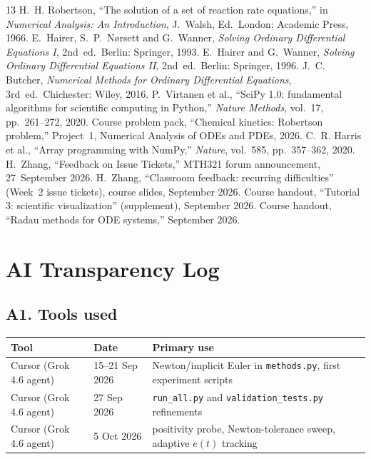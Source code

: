 \documentclass[11pt,a4paper]{article}
\begin{document}
\FloatBarrier
\begin{thebibliography}{13}
H.~H. Robertson, ``The solution of a set of reaction rate equations,'' in \emph{Numerical Analysis: An Introduction}, J.~Walsh, Ed.\ London: Academic Press, 1966.
E.~Hairer, S.~P.\ N{\o}rsett and G.~Wanner, \emph{Solving Ordinary Differential Equations I}, 2nd~ed.\ Berlin: Springer, 1993.
E.~Hairer and G.~Wanner, \emph{Solving Ordinary Differential Equations II}, 2nd~ed.\ Berlin: Springer, 1996.
J.~C. Butcher, \emph{Numerical Methods for Ordinary Differential Equations}, 3rd~ed.\ Chichester: Wiley, 2016.
P.~Virtanen et al., ``SciPy 1.0: fundamental algorithms for scientific computing in Python,'' \emph{Nature Methods}, vol.~17, pp.~261--272, 2020.
Course problem pack, ``Chemical kinetics: Robertson problem,'' Project~1, Numerical Analysis of ODEs and PDEs, 2026.
C.~R. Harris et al., ``Array programming with NumPy,'' \emph{Nature}, vol.~585, pp.~357--362, 2020.
H.~Zhang, ``Feedback on Issue Tickets,'' MTH321 forum announcement, 27~September 2026.
H.~Zhang, ``Classroom feedback: recurring difficulties'' (Week~2 issue tickets), course slides, September 2026.
Course handout, ``Tutorial 3: scientific visualization'' (supplement), September 2026.
Course handout, ``Radau methods for ODE systems,'' September 2026.
\end{thebibliography}

\appendix
\section{AI Transparency Log}
\subsection{A1. Tools used}
\begin{center}
\begin{tabular}{@{}llp{}@{}}
\toprule
Tool & Date & Primary use\\
\midrule
Cursor (Grok 4.6 agent) & 15--21 Sep 2026 & Newton/implicit Euler in
\texttt{methods.py}, first experiment scripts\\
Cursor (Grok 4.6 agent) & 27 Sep 2026 & \texttt{run\_all.py} and
\texttt{validation\_tests.py} refinements\\
Cursor (Grok 4.6 agent) & 5 Oct 2026 & positivity probe, Newton-tolerance
sweep, adaptive \(e(t)\) tracking\\
\bottomrule
\end{tabular}
\end{center}
\end{document}
